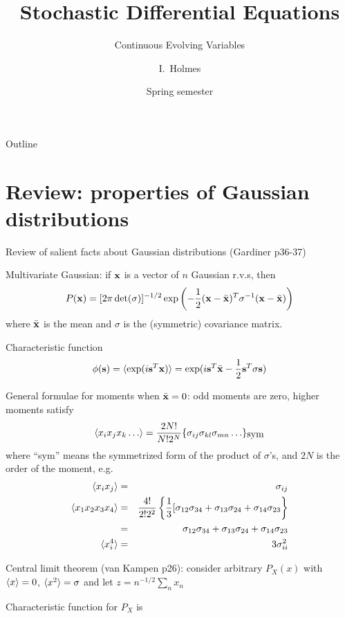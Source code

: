 \documentclass{beamer}
\title[SDEs] %
{Stochastic Differential Equations}
\subtitle
{Continuous Evolving Variables} %
\author%
{I.~Holmes} %
\institute[University of California, Berkeley] %
{
  Department of Bioengineering\\
  University of California, Berkeley}
\date%
{Spring semester}
\begin{document}
\begin{frame}
  \titlepage
\end{frame}

\begin{frame}{Outline}
  \tableofcontents
\end{frame}



\section{Review: properties of Gaussian distributions}

\begin{frame}{}

\itemb
 \item Review of salient facts about Gaussian distributions (Gardiner p36-37)
  \itemb
  \item Multivariate Gaussian: if ${\bf x}$ is a vector of $n$ Gaussian r.v.s, then
\[
P({\bf x}) = [ 2\pi \det(\sigma) ]^{-1/2} \exp \left( -\frac{1}{2}({\bf x} - \bar{\bf x})^T \sigma^{-1} ({\bf x} - \bar{\bf x}) \right)
\]
where $\bar{\bf x}$ is the mean and $\sigma$ is the (symmetric) covariance matrix.
  \item Characteristic function
\[
\phi({\bf s}) = \langle \exp(i {\bf s}^T {\bf x}) \rangle = \exp(i {\bf s}^T \bar{\bf x} - \frac{1}{2} {\bf s}^T \sigma {\bf s})
\]
  \item General formulae for moments when $\bar{\bf x}=0$: odd moments are zero, higher moments satisfy
\[
\langle x_i x_j x_k \ldots \rangle = \frac{2N!}{N! 2^N} \{ \sigma_{ij} \sigma_{kl} \sigma_{mn} \ldots \}_{\mbox{sym}}
\]
where ``sym'' means the symmetrized form of the product of $\sigma$'s, and $2N$ is the order of the moment, e.g.
\begin{eqnarray*}
\langle x_i x_j \rangle & = & \sigma_{ij} \\
\langle x_1 x_2 x_3 x_4 \rangle & = & \frac{4!}{2! 2^2} \left\{ \frac{1}{3} [\sigma_{12}\sigma_{34} + \sigma_{13}\sigma_{24} + \sigma_{14}\sigma_{23}\right\} \\
& = & \sigma_{12}\sigma_{34} + \sigma_{13}\sigma_{24} + \sigma_{14}\sigma_{23} \\
\langle x_i^4 \rangle & = & 3 \sigma^2_{ii}
\end{eqnarray*}
  \item Central limit theorem (van Kampen p26):
consider arbitrary $P_X(x)$ with $\langle x \rangle = 0$, $\langle x^2 \rangle = \sigma$
and let $z = n^{-1/2} \sum_n x_n$
   \itemb
   \item Characteristic function for $P_X$ is

\end{frame}
\end{document}

